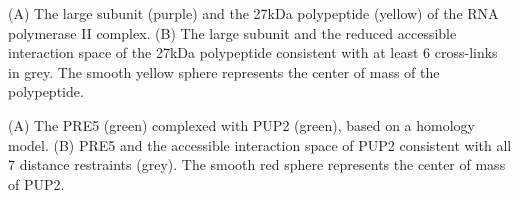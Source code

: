 \caption{}
{(A) The large subunit (purple) and the 27kDa polypeptide (yellow) of
the RNA polymerase II complex. (B) The large subunit and the reduced accessible
interaction space of the 27kDa polypeptide consistent with at least 6
cross-links in grey.  The smooth yellow sphere represents the center of mass of
the polypeptide.}
\stopbuffer


\caption{}
{(A) The PRE5 (green) complexed with PUP2 (green), based on a homology model.
(B) PRE5 and the accessible interaction space of PUP2 consistent with all 7
distance restraints (grey). The smooth red sphere represents the center of mass
of PUP2.}
\stopbuffer
